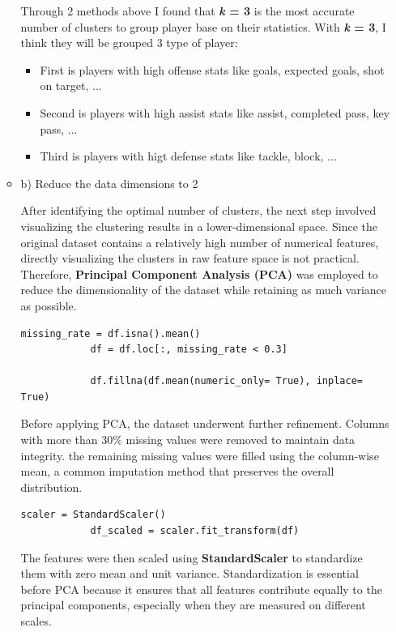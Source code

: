 \documentclass[a4paper,12pt]{article}
\begin{document}
\begin{itemize}[label= {*}, leftmargin= 1cm]
\begin{itemize}[label= {}, leftmargin= 1cm]
        Through 2 methods above I found that \textbf{\textit{k} = 3} is the most accurate number of clusters to group player base on their statistics. With \textbf{\textit{k} = 3}, I think they will be grouped 3 type of player:
        \begin{itemize}[label= {+}, leftmargin= 1cm]
            \item First is players with high offense stats like goals, expected goals, shot on target, ...
            \item Second is players with high assist stats like assist, completed pass, key pass, ...
            \item Third is players with higt defense stats like tackle, block, ...
        \end{itemize}

        \item b) Reduce the data dimensions to 2
        \vspace{0.3cm}

        After identifying the optimal number of clusters, the next step involved visualizing the clustering results in a lower-dimensional space. Since the original dataset contains a relatively high number of numerical features, directly visualizing the clusters in raw feature space is not practical. Therefore, \textbf{Principal Component Analysis (PCA)} was employed to reduce the dimensionality of the dataset while retaining as much variance as possible.
        \vspace{0.3cm}

        \begin{Verbatim}[xleftmargin= -1cm]
            missing_rate = df.isna().mean()
            df = df.loc[:, missing_rate < 0.3]
            
            df.fillna(df.mean(numeric_only= True), inplace= True)
        \end{Verbatim}  
        \vspace{0.3cm}
        Before applying PCA, the dataset underwent further refinement. Columns with more than 30\% missing values were removed to maintain data integrity. the remaining missing values were filled using the column-wise mean, a common imputation method that preserves the overall distribution. 
        \vspace{0.3cm}

        \begin{Verbatim}[xleftmargin= -1cm]
            scaler = StandardScaler()
            df_scaled = scaler.fit_transform(df)
        \end{Verbatim}
        The features were then scaled using \textbf{StandardScaler} to standardize them with zero mean and unit variance. Standardization is essential before PCA because it ensures that all features contribute equally to the principal components, especially when they are measured on different scales.
        \vspace{0.3cm}


\end{itemize}
\end{itemize}
\end{document}
